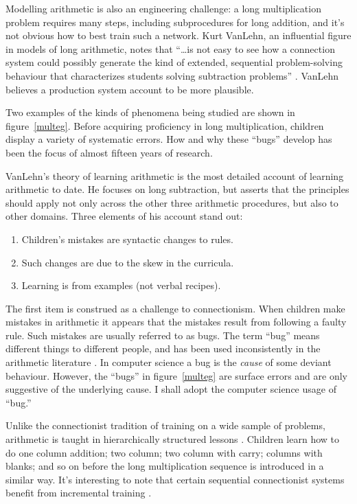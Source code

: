 Modelling arithmetic is also an  engineering challenge: a
long multiplication problem requires many steps, including subprocedures
for long addition, and it's not obvious how to best train such a network.
Kurt VanLehn, an influential figure in models of long arithmetic, notes
that ``\ldots is not easy to see how a connection system could possibly
generate the kind of extended, sequential problem-solving behaviour that
characterizes students solving subtraction problems''
\citeyear[p.~69]{mindbugs}.
VanLehn believes a production system account to be
more plausible.

Two examples of the kinds of phenomena being studied are shown in
figure~\ref{multeg}.  Before acquiring proficiency in long multiplication,
children display a variety of systematic errors. How and why these ``bugs''
develop has been the focus of almost fifteen years of research.

VanLehn's theory of learning arithmetic is the most detailed account of
learning arithmetic to date.  He focuses on long subtraction, but asserts
that the principles should apply not only across the other three arithmetic
procedures, but also to other domains.  Three elements of his account stand
out:

\begin{enumerate}
\item Children's mistakes are syntactic changes to rules.
\item Such changes are due to the skew in the curricula.
\item Learning is from examples (not verbal recipes).
\end{enumerate}

The first item is construed as a challenge to connectionism.  When children
make mistakes in arithmetic it appears that the mistakes result from
following a faulty rule.  Such mistakes are usually referred to as bugs.
The term ``bug'' means different things to different people, and has been
used inconsistently in the arithmetic literature \cite{hennwhy}. In
computer science a bug is the {\em cause} of some deviant behaviour.
However, the ``bugs'' in figure~\ref{multeg} are surface errors and are
only suggestive of the underlying cause.  I shall adopt the computer
science usage of ``bug.''

Unlike the connectionist tradition of training on a wide sample of
problems, arithmetic is taught in hierarchically structured lessons
\cite{resnpsyc}. Children learn how to do one column addition; two column;
two column with carry; columns with blanks; and so on before the
long multiplication sequence is introduced in a similar way.  It's
interesting to note that certain sequential connectionist systems benefit
from incremental training \cite{elmaincr}.

